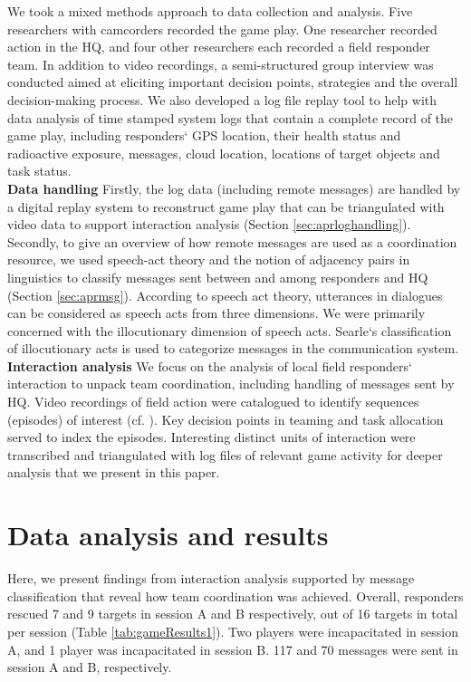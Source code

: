 We took a mixed methods approach to data collection and analysis. Five researchers with camcorders recorded the game play. One researcher recorded action in the HQ, and four other researchers each recorded a field responder team. In addition to video recordings, a semi-structured group interview was conducted aimed at eliciting important decision points, strategies and the overall decision-making process. We also developed a log file replay tool to help with data analysis of time stamped system logs that contain a complete record of the game play, including responders` GPS location, their health status and radioactive exposure, messages, cloud location, locations of target objects and task status. \\

\textbf{Data handling} Firstly, the log data (including remote messages) are handled by a digital replay system to reconstruct game play that can be triangulated with video data to support interaction analysis (Section \ref{sec:aprloghandling}). Secondly, to give an overview of how remote messages are used as a coordination resource, we used speech-act theory and the notion of adjacency pairs in linguistics to classify messages sent between and among responders and HQ (Section \ref{sec:aprmsg}). According to speech act theory, utterances in dialogues can be considered as speech acts from three dimensions. We were primarily concerned with the illocutionary dimension of speech acts. Searle`s classification of illocutionary acts \cite{Searle1976} is used to categorize messages in the communication system.\\

\textbf{Interaction analysis} We focus on the analysis of local field responders` interaction to unpack team coordination, including handling of messages sent by HQ. Video recordings of field action were catalogued to identify sequences (episodes) of interest (cf. \cite{Heath2010}). Key decision points in teaming and task allocation served to index the episodes. Interesting distinct units of interaction were transcribed and triangulated with log files of relevant game activity for deeper analysis that we present in this paper.\\

\section{Data analysis and results}
Here, we present findings from interaction analysis supported by message classification that reveal how team coordination was achieved. Overall, responders rescued 7 and 9 targets in session A and B respectively, out of 16 targets in total per session (Table \ref{tab:gameResults1}). Two players were incapacitated in session A, and 1 player was incapacitated in session B. 117 and 70 messages were sent in session A and B, respectively.\\


